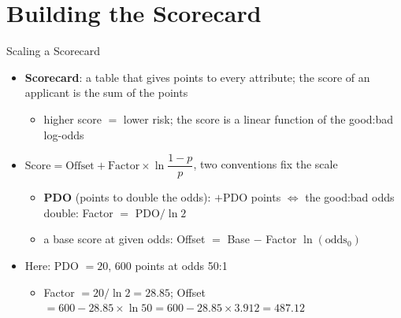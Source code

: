 \section{Building the Scorecard}

\begin{frame}{Scaling a Scorecard}
\itemsize{\small}
\begin{itemize}
    \item \textbf{Scorecard}: a table that gives points to every attribute; the score of an applicant is the sum of the points 
    \begin{itemize}
        \item higher score $=$ lower risk; the score is a linear function of the good:bad log-odds
    \end{itemize}
    \item $\text{Score} = \text{Offset} + \text{Factor} \times \ln\dfrac{1 - p}{p}$, two conventions fix the scale
    \begin{itemize}
        \item \textbf{PDO} (points to double the odds): $+$PDO points $\Leftrightarrow$ the good:bad odds double: Factor $=$ PDO$/\ln 2$
        \item a base score at given odds: Offset $=$ Base $-$ Factor $\ln(\text{odds}_0)$
    \end{itemize}
    \item Here: PDO $= 20$, 600 points at odds 50:1
    \begin{itemize}
        \item Factor $= 20/\ln 2 = 28.85$; Offset $= 600 - 28.85 \times \ln 50 = 600 - 28.85 \times 3.912 = 487.12$
    \end{itemize}
\end{itemize}
\end{frame}

